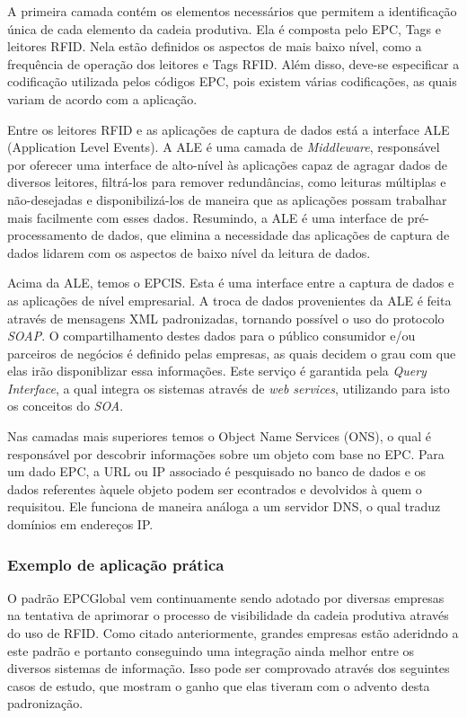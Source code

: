 	A primeira camada contém os elementos necessários que permitem a identificação única de cada elemento da cadeia produtiva. Ela é composta pelo EPC, Tags e leitores RFID. Nela estão definidos os aspectos de mais baixo nível, como a frequência de operação dos leitores e Tags RFID. Além disso, deve-se especificar a codificação utilizada pelos códigos EPC, pois existem várias codificações, as quais variam de acordo com a aplicação.
	
	Entre os leitores RFID e as aplicações de captura de dados está a interface ALE (Application Level Events). A ALE é uma camada de \textit{Middleware}, responsável por oferecer uma interface de alto-nível às aplicações capaz de agragar dados de diversos leitores, filtrá-los para remover redundâncias, como leituras múltiplas e não-desejadas e disponibilizá-los de maneira que as aplicações possam trabalhar mais facilmente com esses dados. Resumindo, a ALE é uma interface de pré-processamento de dados, que elimina a necessidade das aplicações de captura de dados lidarem com os aspectos de baixo nível da leitura de dados.
	
	Acima da ALE, temos o EPCIS. Esta é uma interface entre a captura de dados e as aplicações de nível empresarial. A troca de dados provenientes da ALE é feita através de mensagens XML padronizadas, tornando possível o uso do protocolo \textit{SOAP}. O compartilhamento destes dados para o público consumidor e/ou parceiros de negócios é definido pelas empresas, as quais decidem o grau com que elas irão disponiblizar essa informações. Este serviço é garantida pela \textit{Query Interface}, a qual integra os sistemas através de \textit{web services}, utilizando para isto os conceitos do \textit{SOA}. 
	
	Nas camadas mais superiores temos o Object Name Services (ONS), o qual é responsável por descobrir informações sobre um objeto com base no EPC. Para um dado EPC, a URL ou IP associado é pesquisado no banco de dados e os dados referentes àquele objeto podem ser econtrados e devolvidos à quem o requisitou. Ele funciona de maneira análoga a um servidor DNS, o qual traduz domínios em endereços IP.
	
	\subsubsection{Exemplo de aplicação prática}
	O padrão EPCGlobal vem continuamente sendo adotado por diversas empresas na tentativa de aprimorar o processo de visibilidade da cadeia produtiva através do uso de RFID. Como citado anteriormente, grandes empresas estão aderidndo a este padrão e portanto conseguindo uma integração ainda melhor entre os diversos sistemas de informação. Isso pode ser comprovado através dos seguintes casos de estudo, que mostram o ganho que elas tiveram com o advento desta padronização. 
	
